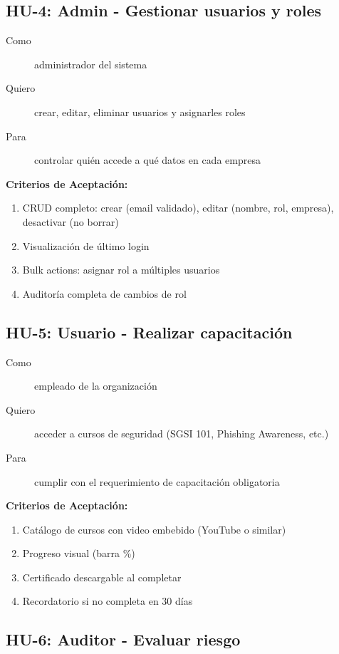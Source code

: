 \documentclass[12pt,a4paper,oneside]{article}
\begin{document}
\subsection{HU-4: Admin - Gestionar usuarios y roles}

\begin{description}
  \item[Como] administrador del sistema
  \item[Quiero] crear, editar, eliminar usuarios y asignarles roles
  \item[Para] controlar quién accede a qué datos en cada empresa
\end{description}

\textbf{Criterios de Aceptación:}
\begin{enumerate}
  \item CRUD completo: crear (email validado), editar (nombre, rol, empresa), desactivar (no borrar)
  \item Visualización de último login
  \item Bulk actions: asignar rol a múltiples usuarios
  \item Auditoría completa de cambios de rol
\end{enumerate}

\subsection{HU-5: Usuario - Realizar capacitación}

\begin{description}
  \item[Como] empleado de la organización
  \item[Quiero] acceder a cursos de seguridad (SGSI 101, Phishing Awareness, etc.)
  \item[Para] cumplir con el requerimiento de capacitación obligatoria
\end{description}

\textbf{Criterios de Aceptación:}
\begin{enumerate}
  \item Catálogo de cursos con video embebido (YouTube o similar)
  \item Progreso visual (barra \%)
  \item Certificado descargable al completar
  \item Recordatorio si no completa en 30 días
\end{enumerate}

\subsection{HU-6: Auditor - Evaluar riesgo}
\end{document}
